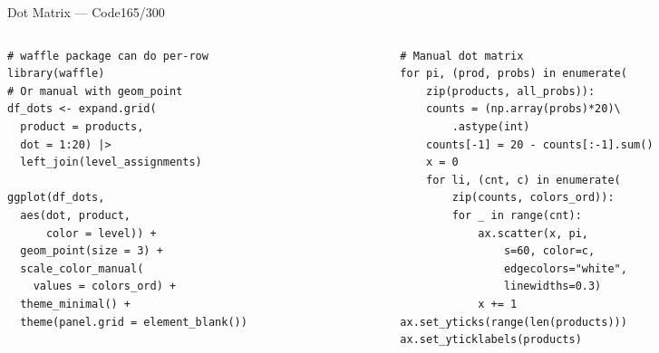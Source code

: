 \documentclass[10pt]{beamer}
\newcommand{\smark}[1]{\hfill{\scriptsize\color{codegray}#1}}
\begin{document}
\begin{frame}[fragile]{Dot Matrix --- Code}\smark{165/300}
\begin{columns}[T]
\begin{column}{0.48\textwidth}
\begin{lstlisting}[style=Rstyle]
# waffle package can do per-row
library(waffle)
# Or manual with geom_point
df_dots <- expand.grid(
  product = products,
  dot = 1:20) |>
  left_join(level_assignments)

ggplot(df_dots,
  aes(dot, product,
      color = level)) +
  geom_point(size = 3) +
  scale_color_manual(
    values = colors_ord) +
  theme_minimal() +
  theme(panel.grid = element_blank())
\end{lstlisting}
\end{column}
\begin{column}{0.48\textwidth}
\begin{lstlisting}[style=Pystyle]
# Manual dot matrix
for pi, (prod, probs) in enumerate(
    zip(products, all_probs)):
    counts = (np.array(probs)*20)\
        .astype(int)
    counts[-1] = 20 - counts[:-1].sum()
    x = 0
    for li, (cnt, c) in enumerate(
        zip(counts, colors_ord)):
        for _ in range(cnt):
            ax.scatter(x, pi,
                s=60, color=c,
                edgecolors="white",
                linewidths=0.3)
            x += 1
ax.set_yticks(range(len(products)))
ax.set_yticklabels(products)
\end{lstlisting}
\end{column}
\end{columns}
\end{frame}
\end{document}
